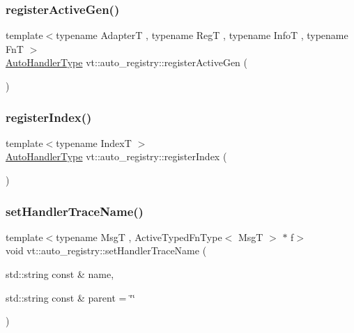 \mbox{\label{namespacevt_1_1auto__registry_aa16ec3feb8483e91ba4775b634ba0c65}} 
\subsubsection{\texorpdfstring{register\+Active\+Gen()}{registerActiveGen()}}
{\footnotesize\ttfamily template$<$typename AdapterT , typename RegT , typename InfoT , typename FnT $>$ \\
\hyperlink{namespacevt_1_1auto__registry_ae295e18699146815bb7d7674594d95d7}{Auto\+Handler\+Type} vt\+::auto\+\_\+registry\+::register\+Active\+Gen (\begin{DoxyParamCaption}{ }\end{DoxyParamCaption})}

\mbox{\label{namespacevt_1_1auto__registry_a234dcadb35d20ff9a4d0e2464680aa36}} 
\subsubsection{\texorpdfstring{register\+Index()}{registerIndex()}}
{\footnotesize\ttfamily template$<$typename IndexT $>$ \\
\hyperlink{namespacevt_1_1auto__registry_ae295e18699146815bb7d7674594d95d7}{Auto\+Handler\+Type} vt\+::auto\+\_\+registry\+::register\+Index (\begin{DoxyParamCaption}{ }\end{DoxyParamCaption})}

\mbox{\label{namespacevt_1_1auto__registry_a9239b3d69aac342e6b7d7554ef84a9cc}} 
\subsubsection{\texorpdfstring{set\+Handler\+Trace\+Name()}{setHandlerTraceName()}}
{\footnotesize\ttfamily template$<$typename MsgT , Active\+Typed\+Fn\+Type$<$ Msg\+T $>$ $\ast$ f$>$ \\
void vt\+::auto\+\_\+registry\+::set\+Handler\+Trace\+Name (\begin{DoxyParamCaption}\item[{std\+::string const \&}]{name,  }\item[{std\+::string const \&}]{parent = {\ttfamily \char`\"{}\char`\"{}} }\end{DoxyParamCaption})}

